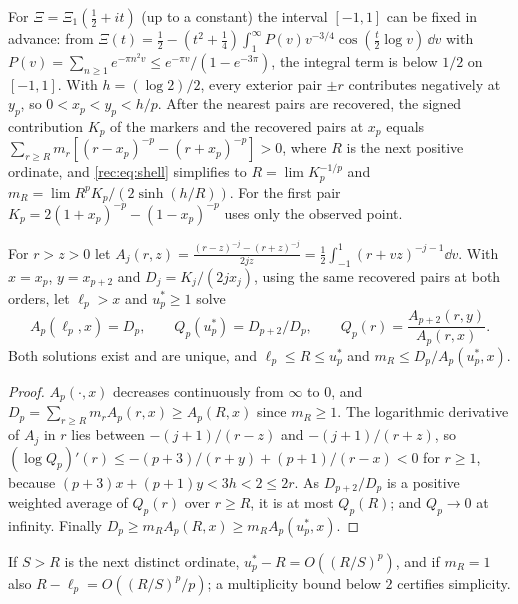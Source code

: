 For $\Xi=\Xi_1(\tfrac12+it)$ (up to a constant) the interval $[-1,1]$ can be fixed in advance:
from $\Xi(t)=\tfrac12-(t^2+\tfrac14)\int_1^\infty P(v)v^{-3/4}\cos(\tfrac t2\log v)\,\dd v$ with
$P(v)=\sum_{n\ge1}e^{-\pi n^2v}\le e^{-\pi v}/(1-e^{-3\pi})$, the integral term is below $1/2$ on
$[-1,1]$. With $h=(\log2)/2$, every exterior pair $\pm r$ contributes negatively at $y_p$, so
$0<x_p<y_p<h/p$. After the nearest pairs are recovered, the signed contribution $K_p$ of the
markers and the recovered pairs at $x_p$ equals
$\sum_{r\ge R}m_r[(r-x_p)^{-p}-(r+x_p)^{-p}]>0$, where $R$ is the next positive ordinate, and
\eqref{rec:eq:shell} simplifies to $R=\lim K_p^{-1/p}$ and $m_R=\lim R^pK_p/(2\sinh(h/R))$.
For the first pair $K_p=2(1+x_p)^{-p}-(1-x_p)^{-p}$ uses only the observed point.

\begin{theorem}\label{rec:thm:onegapbounds}
For $r>z>0$ let $A_j(r,z)=\frac{(r-z)^{-j}-(r+z)^{-j}}{2jz}=\tfrac12\int_{-1}^1(r+vz)^{-j-1}\dd v$.
With $x=x_p$, $y=x_{p+2}$ and $D_j=K_j/(2jx_j)$, using the same recovered pairs at both orders, let
$\ell_p>x$ and $u_p^*\ge1$ solve
\[
 A_p(\ell_p,x)=D_p,\qquad Q_p(u_p^*)=D_{p+2}/D_p,\qquad Q_p(r)=\frac{A_{p+2}(r,y)}{A_p(r,x)} .
\]
Both solutions exist and are unique, and $\ell_p\le R\le u_p^*$ and $m_R\le D_p/A_p(u_p^*,x)$.
\end{theorem}

\begin{proof}
$A_p(\cdot,x)$ decreases continuously from $\infty$ to $0$, and $D_p=\sum_{r\ge R}m_rA_p(r,x)\ge A_p(R,x)$
since $m_R\ge1$. The logarithmic derivative of $A_j$ in $r$ lies between $-(j+1)/(r-z)$ and
$-(j+1)/(r+z)$, so $(\log Q_p)'(r)\le-(p+3)/(r+y)+(p+1)/(r-x)<0$ for $r\ge1$, because
$(p+3)x+(p+1)y<3h<2\le2r$. As $D_{p+2}/D_p$ is a positive weighted average of $Q_p(r)$ over $r\ge R$,
it is at most $Q_p(R)$; and $Q_p\to0$ at infinity. Finally
$D_p\ge m_RA_p(R,x)\ge m_RA_p(u_p^*,x)$.
\end{proof}

If $S>R$ is the next distinct ordinate, $u_p^*-R=O((R/S)^p)$, and if $m_R=1$ also
$R-\ell_p=O((R/S)^p/p)$; a multiplicity bound below $2$ certifies simplicity.

